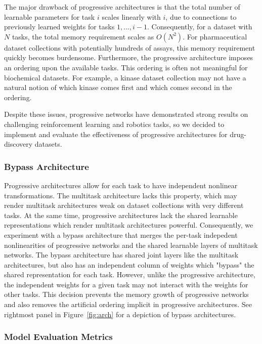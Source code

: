 The major drawback of progressive architectures is that the total number of learnable parameters for task $i$ scales linearly with $i$, due to connections to previously learned weights for tasks $1,\dotsc,i-1$. Consequently, for a dataset with $N$ tasks, the total memory requirement scales as $O(N^2)$. For pharmaceutical dataset collections with potentially hundreds of assays, this memory requirement quickly becomes burdensome. Furthermore, the progressive architecture imposes an ordering upon the available tasks. This ordering is often not meaningful for biochemical datasets. For example, a kinase dataset collection may not have a natural notion of which kinase comes first and which comes second in the ordering.

Despite these issues, progressive networks have demonstrated strong results on challenging reinforcement learning and robotics tasks, so we decided to implement and evaluate the effectiveness of progressive architectures for drug-discovery datasets.

\subsubsection{Bypass Architecture}

Progressive architectures allow for each task to have independent nonlinear transformations. The multitask architecture lacks this property, which may render multitask architectures weak on dataset collections with very different tasks. At the same time, progressive architectures lack the shared learnable representations which render multitask architectures powerful. Consequently, we experiment with a bypass architecture that merges the per-task indepedent nonlinearities of progressive networks and the shared learnable layers of multitask networks. The bypass architecture has shared joint layers like the multitask architectures, but also has an independent column of weights which "bypass" the shared representation for each task. However, unlike the progressive architecture, the independent weights for a given task may not interact with the weights for other tasks. This decision prevents the memory growth of progressive networks and also removes the artificial ordering implicit in progressive architectures. See rightmost panel in Figure~\ref{fig:arch} for a depiction of bypass architectures.

\subsubsection{Model Evaluation Metrics}

